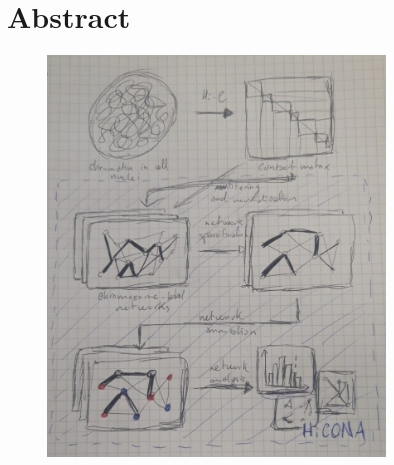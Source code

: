 \graphicspath{{chapters/01_abstract/images}}
\chapter*{Abstract}


\begin{figure}[!h]
  \centering
  \includegraphics[width=0.80\textwidth]{graphical_abstract.jpeg}
\end{figure}

